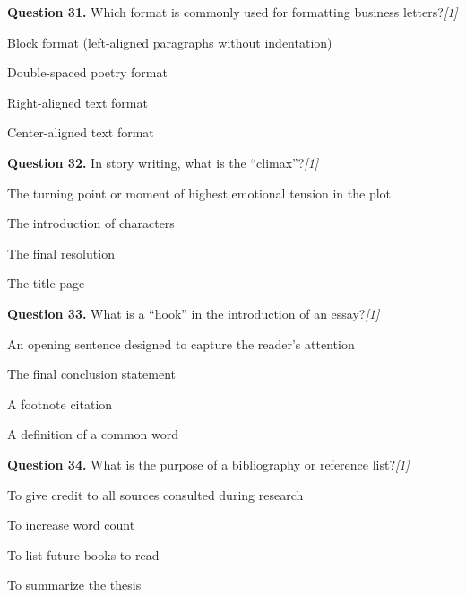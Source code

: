 \documentclass[11pt,a4paper]{article}
\newcommand{\pts}[1]{\hfill   \textit{[#1]}}
\begin{document}
\medskip




\noindent   \textbf{Question 31.} Which format is commonly used for formatting business letters?\pts{1}

\begin{parts}
  \item Block format (left-aligned paragraphs without indentation)
  \item Double-spaced poetry format
  \item Right-aligned text format
  \item Center-aligned text format
\end{parts}

\medskip




\noindent   \textbf{Question 32.} In story writing, what is the ``climax''?\pts{1}

\begin{parts}
  \item The turning point or moment of highest emotional tension in the plot
  \item The introduction of characters
  \item The final resolution
  \item The title page
\end{parts}

\medskip




\noindent   \textbf{Question 33.} What is a ``hook'' in the introduction of an essay?\pts{1}

\begin{parts}
  \item An opening sentence designed to capture the reader's attention
  \item The final conclusion statement
  \item A footnote citation
  \item A definition of a common word
\end{parts}

\medskip




\noindent   \textbf{Question 34.} What is the purpose of a bibliography or reference list?\pts{1}

\begin{parts}
  \item To give credit to all sources consulted during research
  \item To increase word count
  \item To list future books to read
  \item To summarize the thesis
\end{parts}
\end{document}
